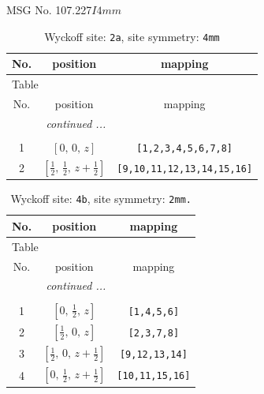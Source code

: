 \documentclass[fleqn,8pt]{jsarticle}
\begin{document}
\setcounter{MaxMatrixCols}{32}

\renewcommand{\tablename}{Table~}
\renewcommand{\figurename}{Figure~}
\begin{center}
\LARGE
MSG No. 107.227\quad$I4mm$
\end{center}
\renewcommand{\arraystretch}{1.2}
\begin{longtable}{ccc}
\caption{Wyckoff site: {\tt 2a}, site symmetry: {\tt 4mm}}
 \\
 \hline \hline
No. & position & mapping \\ \hline \endfirsthead

\multicolumn{2}{l}{\tablename\ \thetable{}} \\
 \hline \hline
No. & position & mapping \\ \hline \endhead

 \hline \hline
\multicolumn{2}{r}{\footnotesize\it continued ...} \\ \endfoot

 \hline \hline
\multicolumn{2}{r}{} \\ \endlastfoot

1 & $\left[ 0,\, 0,\, z \right]$ & {\tt [1,2,3,4,5,6,7,8]} \\ \hline
2 & $\left[ \frac{1}{2},\, \frac{1}{2},\, z + \frac{1}{2} \right]$ & {\tt [9,10,11,12,13,14,15,16]} \\
\end{longtable}
\renewcommand{\arraystretch}{1.2}
\begin{longtable}{ccc}
\caption{Wyckoff site: {\tt 4b}, site symmetry: {\tt 2mm.}}
 \\
 \hline \hline
No. & position & mapping \\ \hline \endfirsthead

\multicolumn{2}{l}{\tablename\ \thetable{}} \\
 \hline \hline
No. & position & mapping \\ \hline \endhead

 \hline \hline
\multicolumn{2}{r}{\footnotesize\it continued ...} \\ \endfoot

 \hline \hline
\multicolumn{2}{r}{} \\ \endlastfoot

1 & $\left[ 0,\, \frac{1}{2},\, z \right]$ & {\tt [1,4,5,6]} \\ \hline
2 & $\left[ \frac{1}{2},\, 0,\, z \right]$ & {\tt [2,3,7,8]} \\ \hline
3 & $\left[ \frac{1}{2},\, 0,\, z + \frac{1}{2} \right]$ & {\tt [9,12,13,14]} \\ \hline
4 & $\left[ 0,\, \frac{1}{2},\, z + \frac{1}{2} \right]$ & {\tt [10,11,15,16]} \\
\end{longtable}
\end{document}
